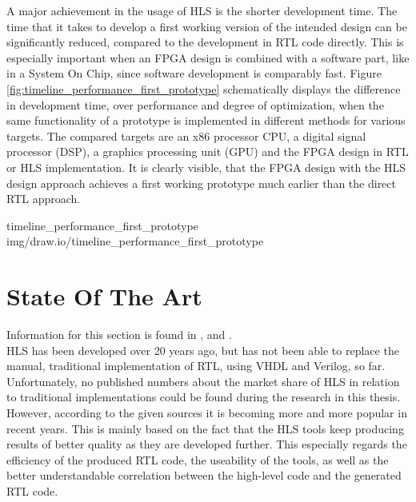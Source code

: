 A major achievement in the usage of HLS is the shorter development time.
The time that it takes to develop a first working version of the intended design can be significantly reduced, compared to the development in RTL code directly.
This is especially important when an FPGA design is combined with a software part, like in a System On Chip, since software development is comparably fast.
Figure \ref{fig:timeline_performance_first_prototype} schematically displays the difference in development time, over performance and degree of optimization, when the same functionality of a prototype is implemented in different methods for various targets.
The compared targets are an x86 processor CPU, a digital signal processor (DSP), a graphics processing unit (GPU) and the FPGA design in RTL or HLS implementation.
It is clearly visible, that the FPGA design with the HLS design approach achieves a first working prototype much earlier than the direct RTL approach.

 {timeline_performance_first_prototype} {img/draw.io/timeline_performance_first_prototype}


\section{State Of The Art}

Information for this section is found in \cite{EvolutionOfHLS}, \cite{XilinxVivisHLSOpenSource} and \cite{CompareHlsVHDLArticle}.\\

HLS has been developed over 20 years ago, but has not been able to replace the manual, traditional implementation of RTL, using VHDL and Verilog, so far.
Unfortunately, no published numbers about the market share of HLS in relation to traditional implementations could be found during the research in this thesis.
However, according to the given sources it is becoming more and more popular in recent years.
This is mainly based on the fact that the HLS tools keep producing results of better quality as they are developed further.
This especially regards the efficiency of the produced RTL code, the useability of the tools, as well as the better understandable correlation between the high-level code and the generated RTL code.\\

